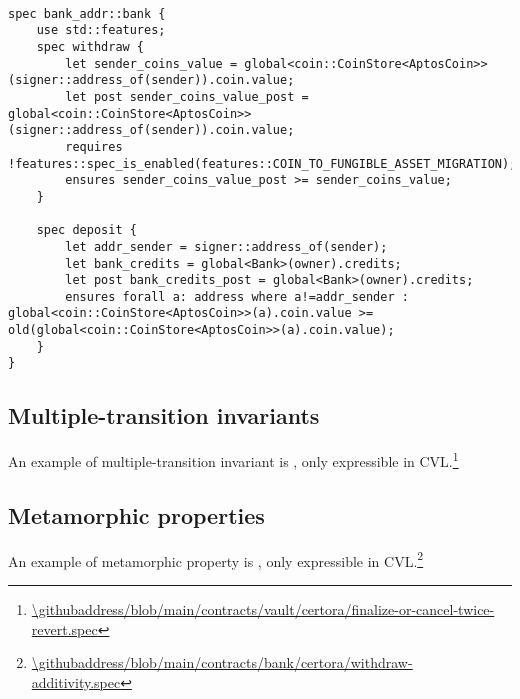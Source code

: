 \begin{lstlisting}[language=move,caption={Specification of \specurl{bank}{assets-dec-onlyif-deposit} in MSL}]

spec bank_addr::bank {
    use std::features;    
    spec withdraw {
        let sender_coins_value = global<coin::CoinStore<AptosCoin>>(signer::address_of(sender)).coin.value;
        let post sender_coins_value_post = global<coin::CoinStore<AptosCoin>>(signer::address_of(sender)).coin.value;
        requires !features::spec_is_enabled(features::COIN_TO_FUNGIBLE_ASSET_MIGRATION);
        ensures sender_coins_value_post >= sender_coins_value;
    }

    spec deposit {
        let addr_sender = signer::address_of(sender);
        let bank_credits = global<Bank>(owner).credits;
        let post bank_credits_post = global<Bank>(owner).credits;
        ensures forall a: address where a!=addr_sender : global<coin::CoinStore<AptosCoin>>(a).coin.value >= old(global<coin::CoinStore<AptosCoin>>(a).coin.value);
    }
}
\end{lstlisting}







\subsection{Multiple-transition invariants}

An example of multiple-transition invariant is , only expressible in CVL.\footnote{\url{\githubaddress/blob/main/contracts/vault/certora/finalize-or-cancel-twice-revert.spec}}

\subsection{Metamorphic properties}
An example of metamorphic property is , only expressible in CVL.\footnote{\url{\githubaddress/blob/main/contracts/bank/certora/withdraw-additivity.spec}}

\endinput




